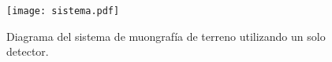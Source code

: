 	\begin{figure}[h]
		\centering
		\texttt{[image: sistema.pdf]}
		\caption{Diagrama del sistema de muongrafía de terreno utilizando un solo detector.}
		\label{fig:sistema-completo}
	\end{figure}